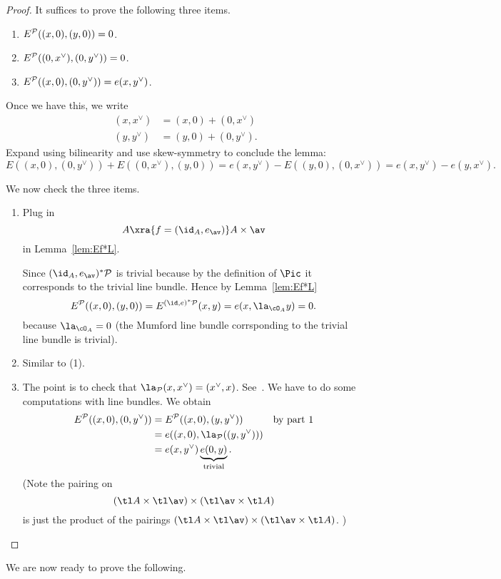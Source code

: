 \begin{proof}
It suffices to prove the following three items.
\begin{enumerate}
\item
$E^{\cal P}((x,0),(y,0))=0$.
\item
$E^{\cal P}((0,x^{\vee}), (0,y^{\vee}))=0$.
\item
$E^{\cal P}((x,0),(0,y^{\vee}))=e(x,y^{\vee})$.
\end{enumerate}
Once we have this, we write
\begin{align*}
(x,x^{\vee})&=(x,0)+(0,x^{\vee})\\
(y,y^{\vee})&=(y,0)+(0,y^{\vee}).
\end{align*}
Expand using bilinearity and use skew-symmetry to conclude the lemma:
\[
E((x,0),(0,y^{\vee}))+E((0,x^{\vee}),(y,0))=e(x,y^{\vee})-E((y,0),(0,x^{\vee}))=e(x,y^{\vee})-e(y,x^{\vee}).
\]

We now check the three items.
\begin{enumerate}
\item Plug in 
\[
A\xra{f=(\id_A,e_{\av})} A\times \av
\]
in Lemma~\ref{lem:Ef*L}.

Since $(\id_A,e_{\av})^*\cal P$ is trivial %
because by the definition of $\Pic$ it corresponds to the trivial line bundle. Hence by Lemma~\ref{lem:Ef*L}
\[
E^{\cal P} ((x,0),(y,0)) = E^{(\id, e)^*\cal P}(x,y)=e(x,\la_{\cO_A} y)=0.
\] 
because $\la_{\cO_A}=0$ (the Mumford line bundle corrsponding to the trivial line bundle is trivial).
\item Similar to (1).
\item The point is to check that $\la_{\cal P}(x,x^{\vee})=(x^{\vee}, x)$. See~\cite{Mu70}. We have to do some computations with line bundles. We obtain 
\begin{align*}
E^{\cal P}((x,0),(0,y^{\vee}))&=E^{\cal P} ((x,0),(y,y^{\vee}))&\text{by part 1}\\
&=e((x,0),\la_{\cal P}((y,y^{\vee})))\\%
&=e(x,y^{\vee}) \underbrace{e(0,y)}_{\text{trivial}}.
\end{align*}
(Note the pairing on
\[
(\tl A\times \tl \av )\times(\tl \av \times \tl A)
\]
is just the product of the pairings $(\tl A\times \tl \av)\times (\tl \av\times \tl A)$. )
\end{enumerate}
\end{proof}
We are now ready to prove the following. %
